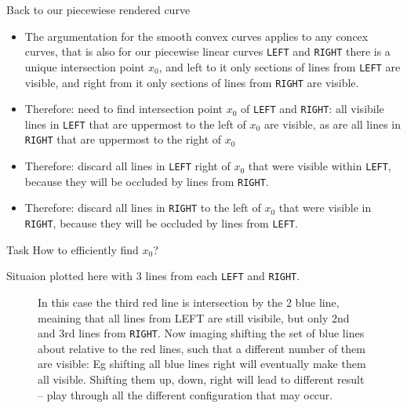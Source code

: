 \documentclass[ignorenonframetext,]{beamer}
\begin{document}
\begin{frame}{Back to our piecewiese rendered curve}
  \begin{itemize}
  \item The argumentation for the smooth convex curves applies to any
    concex curves, that is also for our piecewise linear curves
    \texttt{LEFT} and \texttt{RIGHT} there is a unique intersection
    point $x_0$, and left to it only sections of lines from \texttt{LEFT}
    are visible, and right from it only sections of lines from
    \texttt{RIGHT} are visible.
  \item Therefore: need to find intersection point $x_0$ of
    \texttt{LEFT} and \texttt{RIGHT}: all visibile lines in
    \texttt{LEFT} that are uppermost to the left of $x_0$ are
    visible, as are all lines in \texttt{RIGHT} that are uppermost to
    the right of $x_0$
  \item Therefore: discard all lines in \texttt{LEFT} right of $x_0$ that were
    visible within \texttt{LEFT}, because they will be occluded by lines from \texttt{RIGHT}.
  \item Therefore: discard all lines in \texttt{RIGHT} to the left of
    $x_0$ that were visible in \texttt{RIGHT}, because they will be
    occluded by lines from \texttt{LEFT}.
  \end{itemize}
  
  \begin{block}{Task}
    How to efficiently find $x_0$?
  \end{block}
\end{frame}

\begin{frame}
  Situaion plotted here with 3 lines from each \texttt{LEFT} and
  \texttt{RIGHT}.
  \begin{figure}
    \centering


\caption{In this case the third red line is intersection by the 2 blue line,
  meaining that all lines from LEFT are still visibile, but only 2nd
  and 3rd lines from \texttt{RIGHT}. Now imaging shifting the set of
  blue lines about relative to the red lines, such that a different
  number of them are visible: Eg shifting all blue lines right will
  eventually make them all visible. Shifting them up, down, right will
  lead to different result -- play through all the different
  configuration that may occur.}
\end{figure}
\end{frame}
\end{document}
